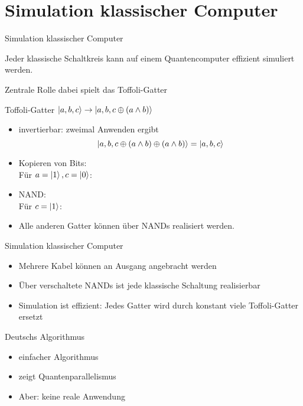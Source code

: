 \documentclass[xcolor=colortbl
,ngerman
]{beamer}
\begin{document}
\section{Simulation klassischer Computer}

\begin{frame}{Simulation klassischer Computer}
    \begin{theorem}
        Jeder klassische Schaltkreis kann auf einem Quantencomputer effizient simuliert werden.
    \end{theorem}

    Zentrale Rolle dabei spielt das Toffoli-Gatter
\end{frame}

\begin{frame}[t]{Toffoli-Gatter}
    \(
        \left|a, b, c\right\rangle \rightarrow \left|a, b, c\oplus (a\wedge b)\right\rangle
    \)

     {
    \begin{itemize}
        \item invertierbar: zweimal Anwenden ergibt 
            \[
            \left|a, b, c\oplus (a\wedge b) \oplus (a\wedge b)\right\rangle = \left|a, b, c\right\rangle
            \]
        \item Kopieren von Bits: \\ Für $a = \left|1\right\rangle, c = \left|0\right\rangle$: 
        \item NAND: \\ Für $c = \left|1\right\rangle$: 
        \item Alle anderen Gatter können über NANDs realisiert werden.
    \end{itemize}
    }
\end{frame}

\begin{frame}{Simulation klassischer Computer}
    \begin{itemize}
        \item Mehrere Kabel können an Ausgang angebracht werden
        \item Über verschaltete NANDs ist jede klassische Schaltung realisierbar
        \item Simulation ist effizient: Jedes Gatter wird durch konstant viele Toffoli-Gatter ersetzt
    \end{itemize}
\end{frame}

\begin{frame}{Deutschs Algorithmus}
    \begin{itemize}
        \item einfacher Algorithmus
        \item zeigt Quantenparallelismus
        \item Aber: keine reale Anwendung
    \end{itemize}
\end{frame}
\end{document}
